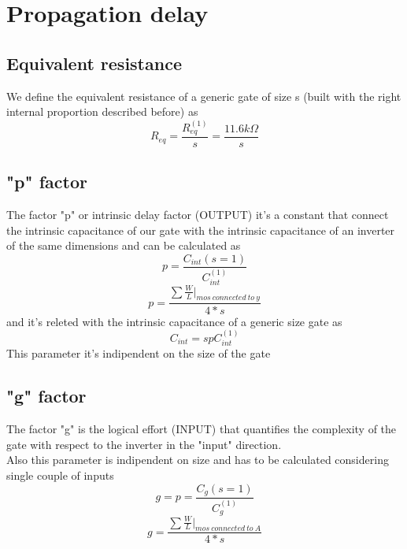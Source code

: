 \section{Propagation delay}

\subsection{Equivalent resistance}
We define the equivalent resistance of a generic gate of size s (built with the right internal proportion described before) as 
\begin{equation}
R_{eq}=\frac{R_{eq}^{(1)}}{s}=\frac{11.6k\Omega}{s}
\end{equation}

\subsection{"p" factor}
The factor "p" or intrinsic delay factor (OUTPUT) it's a constant that connect the intrinsic capacitance of our gate with the intrinsic capacitance of an inverter of the same dimensions and can be calculated as 
\begin{equation}
p=\frac{C_{int}(s=1)}{C_{int}^{(1)}}
\end{equation}
\begin{equation}
p=\frac{\sum \frac{W}{L}|_{mos \ connected \ to \ y}}{4*s}
\end{equation}
and it's releted with the intrinsic capacitance of a generic size gate as 
\begin{equation}
C_{int}=spC_{int}^{(1)}
\end{equation}
This parameter it's indipendent on the size of the gate

\subsection{"g" factor}
The factor "g" is the logical effort (INPUT) that quantifies the complexity of the gate with respect to the inverter in the "input" direction.\\
Also this parameter is indipendent on size and has to be calculated considering single couple of inputs\\ 
\begin{equation}
g=p=\frac{C_{g}(s=1)}{C_{g}^{(1)}}
\end{equation}
\begin{equation}
g=\frac{\sum \frac{W}{L}|_{mos \ connected \ to \ A}}{4*s}
\end{equation}


